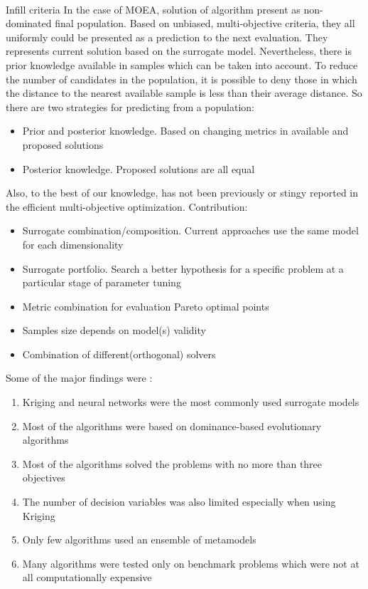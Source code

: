         \paragraph{}{Infill criteria}
        In the case of MOEA, solution of algorithm present as non-dominated final population. Based on unbiased, multi-objective criteria, they all uniformly could be presented as a prediction to the next evaluation. They represents current solution based on the surrogate model. Nevertheless, there is prior knowledge available in samples which can be taken into account. To reduce the number of candidates in the population, it is possible to deny those in which the distance to the nearest available sample is less than their average distance.
        So there are two strategies for predicting from a population:
        \begin{itemize}
            \item Prior and posterior knowledge. Based on changing metrics in available and proposed solutions
            \item Posterior knowledge. Proposed solutions are all equal
        \end{itemize}


        
        Also, to the best of our knowledge, has not been previously or stingy reported in the efficient multi-objective optimization.
        Contribution:
        \begin{itemize}
            \item Surrogate combination/composition. Current approaches use the same model for each dimensionality
            \item Surrogate portfolio. Search a better hypothesis  for a specific problem at a particular stage of parameter tuning
            \item Metric combination for evaluation Pareto optimal points
            \item Samples size depends on model(s) validity
            \item Combination of different(orthogonal) solvers
        \end{itemize}

        Some of the major findings were \cite{SoftSurvey}:
        \begin{enumerate}
            \item Kriging and neural networks were the most commonly used surrogate models
            \item Most of the algorithms were based on dominance-based evolutionary algorithms
            \item Most of the algorithms solved the problems with no more than three objectives
            \item The number of decision variables was also limited especially when using Kriging
            \item Only few algorithms used an ensemble of metamodels 
            \item Many algorithms were tested only on benchmark problems which were not at all computationally expensive
        \end{enumerate}